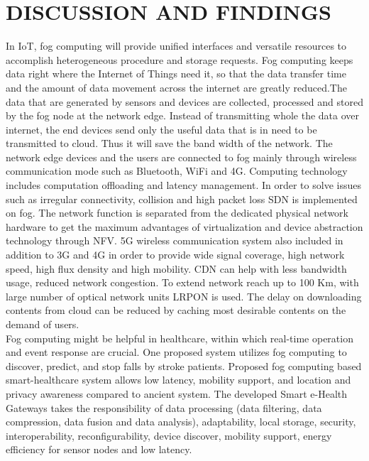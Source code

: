 \documentclass[10pt,a4paper,journal]{IEEEtran}
\begin{document}
\section{DISCUSSION AND FINDINGS}
\hspace*{1em}	In IoT, fog computing will provide unified interfaces and versatile resources to accomplish heterogeneous procedure and storage requests. Fog computing keeps data right where the Internet of Things need it, so that the data transfer time and the amount of data movement across the internet are greatly reduced.The data that are generated by sensors and devices are collected, processed and stored by the fog node at the network edge. 
Instead of transmitting whole the data over internet, the end devices send only the useful data that is in need to be transmitted to cloud. Thus it will save the band width of the network. The network edge devices and the users are connected to fog mainly through wireless communication mode such as Bluetooth, WiFi and 4G. Computing technology includes computation offloading and latency management. In order to solve issues such as irregular connectivity, collision and high packet loss SDN is implemented on fog. The network function is separated from the dedicated physical network hardware to get the maximum advantages of virtualization and device abstraction technology through NFV. 5G wireless communication system also included in addition to 3G and 4G in order to provide wide signal coverage, high network speed, high flux density and high mobility. CDN can help with less bandwidth usage, reduced network congestion. To extend network reach up to 100 Km, with large number of optical network units LRPON is used. The delay on downloading contents from cloud can be reduced by caching most desirable contents on the demand of users.\\	
\hspace*{2em}	Fog computing might be helpful in healthcare, within which real-time operation and event response are crucial. One proposed system utilizes fog computing to discover, predict, and stop falls by stroke patients. Proposed fog computing based smart-healthcare system allows low latency, mobility support, and location and privacy awareness compared to ancient system. The developed Smart e-Health Gateways takes the responsibility of data processing (data filtering, data compression, data fusion and data analysis), adaptability, local storage, security, interoperability, reconfigurability, device discover, mobility support, energy efficiency for sensor nodes and low latency.\\
\end{document}
